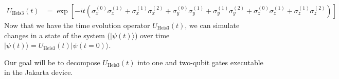 \begin{equation}
    \begin{split}
        U_{\text{Heis3}}(t) &= \exp\left[-it \left(\sigma_x^{(0)}\sigma_x^{(1)} + \sigma_x^{(1)}\sigma_x^{(2)} + \sigma_y^{(0)}\sigma_y^{(1)}  + \sigma_y^{(1)}\sigma_y^{(2)} + \sigma_z^{(0)}\sigma_z^{(1)} + \sigma_z^{(1)}\sigma_z^{(2)}\right) \right]
    \end{split}
\end{equation}
Now that we have the time evolution operator $U_{\text{Heis3}}(t)$, we can simulate changes in a state of the system ($|\psi(t)\rangle$) over time $|\psi(t)\rangle = U_{\text{Heis3}}(t)|\psi(t=0)\rangle$. 

Our goal will be to decompose $U_{\text{Heis3}}(t)$ into one and two-qubit gates executable in the Jakarta device.